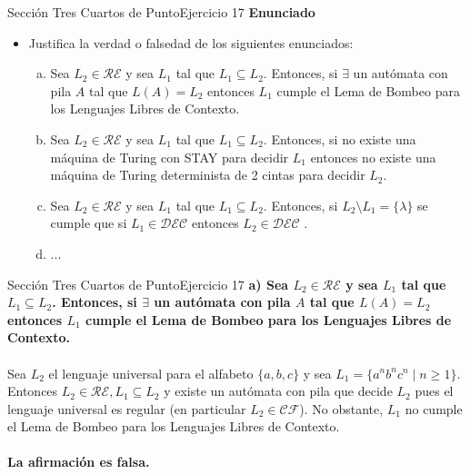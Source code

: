 \documentclass[10pt, envcountsect, presentation, aspectratio=169]{beamer}
\newcommand{\ld}{\ensuremath{\mathcal {DEC}}}
\newcommand{\lr}{\ensuremath{\mathcal {RE}}}
\begin{document}

\begin{frame}{Sección Tres Cuartos de Punto}{Ejercicio 17}
    \textbf{Enunciado}
    \begin{itemize}
        \item Justifica la verdad o falsedad de los siguientes enunciados:
        \begin{enumerate}[a)]
            \item Sea $L_2 \in \lr$ y sea $L_1$ tal que $L_1 \subseteq L_2$. Entonces, si $\exists$ un autómata con pila $A$ tal que $L(A)=L_2$ entonces $L_1$ cumple el Lema de Bombeo para los Lenguajes Libres de Contexto. 
            \item Sea $L_2 \in \lr$ y sea $L_1$ tal que $L_1 \subseteq L_2$. Entonces, si no  existe una máquina de Turing con  STAY para decidir $L_1$ entonces no existe una máquina de Turing determinista de 2 cintas para decidir $L_2$.
            \item Sea $L_2 \in \lr$ y sea $L_1$ tal que $L_1 \subseteq L_2$. Entonces, si $L_2 \setminus L_1=\{\lambda\}$ se cumple que si $L_1 \in \ld$ entonces $L_2 \in \ld$ .
            \item ...
        \end{enumerate}
    \end{itemize}
\end{frame}


\begin{frame}{Sección Tres Cuartos de Punto}{Ejercicio 17}
    \textbf{a) Sea $L_2 \in \lr$ y sea $L_1$ tal que $L_1 \subseteq L_2$. Entonces, si $\exists$ un autómata con pila $A$ tal que $L(A)=L_2$ entonces $L_1$ cumple el Lema de Bombeo para los Lenguajes Libres de Contexto.}\\~\\
    Sea $L_2$ el lenguaje universal para el alfabeto $\{a,b,c\}$ y sea $L_1=\{a^n b^n c^n \mid n \geq 1\}$.
    Entonces $L_2 \in \mathcal{RE}, L_1 \subseteq L_2$ y existe un autómata con pila que decide $L_2$ pues el lenguaje universal es regular (en particular $L_2 \in \mathcal{CF}$).
    No obstante, $L_1$ no cumple el Lema de Bombeo para los Lenguajes Libres de Contexto.\\~\\
    \textbf{La afirmación es falsa.}
\end{frame}
\end{document}

